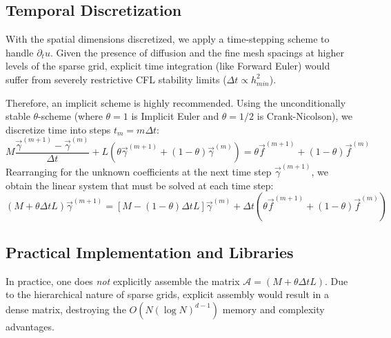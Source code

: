 \documentclass[12pt, a4paper]{article}
\begin{document}
\subsection{Temporal Discretization}
With the spatial dimensions discretized, we apply a time-stepping scheme to handle $\partial_t u$. Given the presence of diffusion and the fine mesh spacings at higher levels of the sparse grid, explicit time integration (like Forward Euler) would suffer from severely restrictive CFL stability limits ($\Delta t \propto h_{min}^2$).

Therefore, an implicit scheme is highly recommended. Using the unconditionally stable $\theta$-scheme (where $\theta=1$ is Implicit Euler and $\theta=1/2$ is Crank-Nicolson), we discretize time into steps $t_m = m \Delta t$:
\begin{equation}
M \frac{\vec{\gamma}^{(m+1)} - \vec{\gamma}^{(m)}}{\Delta t} + L \left( \theta \vec{\gamma}^{(m+1)} + (1-\theta) \vec{\gamma}^{(m)} \right) = \theta \vec{f}^{(m+1)} + (1-\theta) \vec{f}^{(m)}
\end{equation}
Rearranging for the unknown coefficients at the next time step $\vec{\gamma}^{(m+1)}$, we obtain the linear system that must be solved at each time step:
\begin{equation}
(M + \theta \Delta t L) \vec{\gamma}^{(m+1)} = \left[ M - (1-\theta) \Delta t L \right] \vec{\gamma}^{(m)} + \Delta t \left( \theta \vec{f}^{(m+1)} + (1-\theta) \vec{f}^{(m)} \right)
\end{equation}

\subsection{Practical Implementation and Libraries}
In practice, one does \textit{not} explicitly assemble the matrix $\mathcal{A} = (M + \theta \Delta t L)$. Due to the hierarchical nature of sparse grids, explicit assembly would result in a dense matrix, destroying the $O(N (\log N)^{d-1})$ memory and complexity advantages. 
\end{document}
